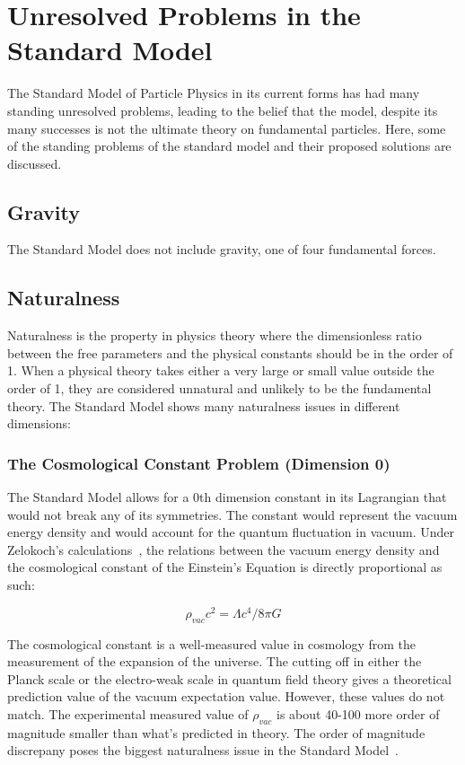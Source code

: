 \section{Unresolved Problems in the Standard Model}
The Standard Model of Particle Physics in its current forms has had many standing unresolved problems, leading to the belief that the model, despite its many successes is not the ultimate theory on fundamental particles. Here, some of the standing problems of the standard model and their proposed solutions are discussed.

\subsection{Gravity}
The Standard Model does not include gravity, one of four fundamental forces.     

\subsection{Naturalness}
Naturalness is the property in physics theory where the dimensionless ratio between the free parameters and the physical constants should be in the order of 1. When a physical theory takes either a very large or small value outside the order of 1, they are considered unnatural and unlikely to be the fundamental theory. 
The Standard Model shows many naturalness issues in different dimensions: 

\subsubsection{The Cosmological Constant Problem (Dimension 0)}
The Standard Model allows for a 0th dimension constant in its Lagrangian that would not break any of its symmetries. The constant would represent the vacuum energy density and would account for the quantum fluctuation in vacuum. Under Zelokoch's calculations~\cite{zel1968cosmological}, the relations between the vacuum energy density and the cosmological constant of the Einstein's Equation is directly proportional as such:

\begin{equation}
    \rho_{vac}c^2=\Lambda c^4/8\pi G
\label{eq:cosmoconst}
\end{equation}

The cosmological constant is a well-measured value in cosmology from the measurement of the expansion of the universe. The cutting off in either the Planck scale or the electro-weak scale in quantum field theory gives a theoretical prediction value of the vacuum expectation value. However, these values do not match. The experimental measured value of $\rho_{vac}$ is about 40-100 more order of magnitude smaller than what's predicted in theory. The order of magnitude discrepany poses the
biggest naturalness issue in the Standard Model~\cite{V2002}.

